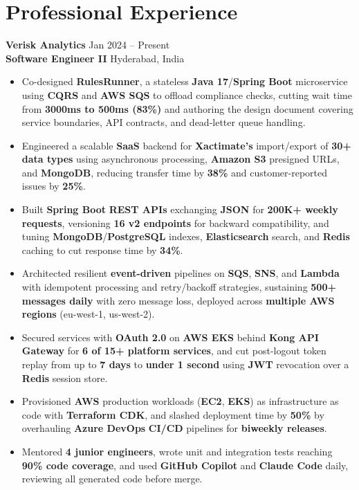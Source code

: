 \documentclass[a4paper,10pt]{article}
\begin{document}
\section*{Professional Experience}

\textbf{Verisk Analytics} \hfill Jan 2024 -- Present \\
\textbf{Software Engineer II} \hfill Hyderabad, India

\begin{itemize}[leftmargin=*]
    \item Co-designed \textbf{RulesRunner}, a stateless \textbf{Java 17}/\textbf{Spring Boot} microservice using \textbf{CQRS} and \textbf{AWS SQS} to offload compliance checks, cutting wait time from \textbf{3000ms to 500ms (83\%)} and authoring the design document covering service boundaries, API contracts, and dead-letter queue handling.
    \item Engineered a scalable \textbf{SaaS} backend for \textbf{Xactimate's} import/export of \textbf{30+ data types} using asynchronous processing, \textbf{Amazon S3} presigned URLs, and \textbf{MongoDB}, reducing transfer time by \textbf{38\%} and customer-reported issues by \textbf{25\%}.
    \item Built \textbf{Spring Boot} \textbf{REST APIs} exchanging \textbf{JSON} for \textbf{200K+ weekly requests}, versioning \textbf{16 v2 endpoints} for backward compatibility, and tuning \textbf{MongoDB}/\textbf{PostgreSQL} indexes, \textbf{Elasticsearch} search, and \textbf{Redis} caching to cut response time by \textbf{34\%}.
    \item Architected resilient \textbf{event-driven} pipelines on \textbf{SQS}, \textbf{SNS}, and \textbf{Lambda} with idempotent processing and retry/backoff strategies, sustaining \textbf{500+ messages daily} with zero message loss, deployed across \textbf{multiple AWS regions} (eu-west-1, us-west-2).
    \item Secured services with \textbf{OAuth 2.0} on \textbf{AWS EKS} behind \textbf{Kong API Gateway} for \textbf{6 of 15+ platform services}, and cut post-logout token replay from up to \textbf{7 days} to \textbf{under 1 second} using \textbf{JWT} revocation over a \textbf{Redis} session store.
    \item Provisioned \textbf{AWS} production workloads (\textbf{EC2}, \textbf{EKS}) as infrastructure as code with \textbf{Terraform CDK}, and slashed deployment time by \textbf{50\%} by overhauling \textbf{Azure DevOps} \textbf{CI/CD} pipelines for \textbf{biweekly releases}.
    \item Mentored \textbf{4 junior engineers}, wrote unit and integration tests reaching \textbf{90\% code coverage}, and used \textbf{GitHub Copilot} and \textbf{Claude Code} daily, reviewing all generated code before merge.
\end{itemize}
\end{document}
